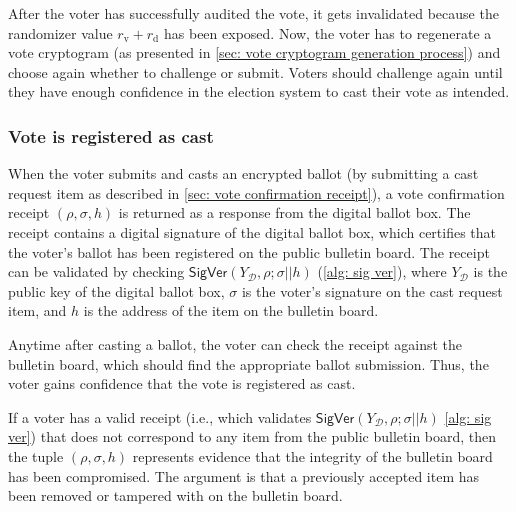 After the voter has successfully audited the vote, it gets invalidated because the randomizer value $r_\mathrm{v} + r_\mathrm{d}$ has been exposed. Now, the voter has to regenerate a vote cryptogram (as presented in \cref{sec: vote cryptogram generation process}) and choose again whether to challenge or submit. Voters should challenge again until they have enough confidence in the election system to cast their vote as intended.

 
\subsubsection{Vote is registered as cast} \label{sec: vote is registered as cast}
When the voter submits and casts an encrypted ballot (by submitting a cast request item as described in \cref{sec: vote confirmation receipt}), a vote confirmation receipt $(\rho, \sigma, h)$ is returned as a response from the digital ballot box. The receipt contains a digital signature of the digital ballot box, which certifies that the voter's ballot has been registered on the public bulletin board. The receipt can be validated by checking $\mathsf{SigVer} (Y_\mathcal{D}, \rho; \sigma || h)$ (\cref{alg: sig ver}), where $Y_\mathcal{D}$ is the public key of the digital ballot box, $\sigma$ is the voter's signature on the cast request item, and $h$ is the address of the item on the bulletin board.

Anytime after casting a ballot, the voter can check the receipt against the bulletin board, which should find the appropriate ballot submission. Thus, the voter gains confidence that the vote is registered as cast.

If a voter has a valid receipt (i.e., which validates $\mathsf{SigVer} (Y_\mathcal{D}, \rho; \sigma || h)$ \cref{alg: sig ver}) that does not correspond to any item from the public bulletin board, then the tuple $(\rho, \sigma, h)$ represents evidence that the integrity of the bulletin board has been compromised. The argument is that a previously accepted item has been removed or tampered with on the bulletin board.
